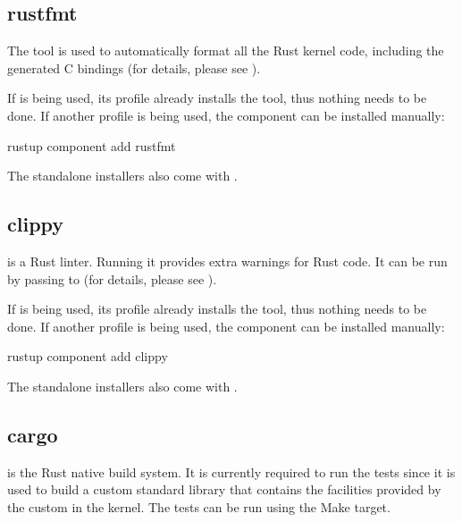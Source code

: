 \documentclass[a4paper,11pt,english]{sphinxmanual}
\begin{document}
\subsection{rustfmt}
\label{\detokenize{quick-start:rustfmt}}
The  tool is used to automatically format all the Rust kernel code,
including the generated C bindings (for details, please see
{\hyperref[\detokenize{coding-guidelines::doc}]{}}).

If  is being used, its  profile already installs the tool,
thus nothing needs to be done. If another profile is being used, the component
can be installed manually:

\begin{sphinxVerbatim}[commandchars=\\\{\}]
rustup component add rustfmt
\end{sphinxVerbatim}

The standalone installers also come with .


\subsection{clippy}
\label{\detokenize{quick-start:clippy}}
 is a Rust linter. Running it provides extra warnings for Rust code.
It can be run by passing  to  (for details, please see
{\hyperref[\detokenize{general-information::doc}]{}}).

If  is being used, its  profile already installs the tool,
thus nothing needs to be done. If another profile is being used, the component
can be installed manually:

\begin{sphinxVerbatim}[commandchars=\\\{\}]
rustup component add clippy
\end{sphinxVerbatim}

The standalone installers also come with .


\subsection{cargo}
\label{\detokenize{quick-start:cargo}}
 is the Rust native build system. It is currently required to run
the tests since it is used to build a custom standard library that contains
the facilities provided by the custom  in the kernel. The tests can
be run using the  Make target.
\end{document}
